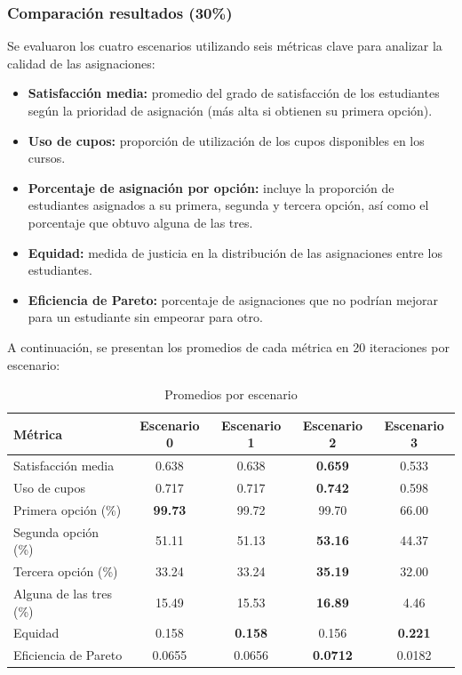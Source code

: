 \documentclass{article}
\begin{document}
\subsubsection{Comparación resultados (30\%)}

Se evaluaron los cuatro escenarios utilizando seis métricas clave para analizar la calidad de las asignaciones:

\begin{itemize}
  \item \textbf{Satisfacción media:} promedio del grado de satisfacción de los estudiantes según la prioridad de asignación (más alta si obtienen su primera opción).
  \item \textbf{Uso de cupos:} proporción de utilización de los cupos disponibles en los cursos.
  \item \textbf{Porcentaje de asignación por opción:} incluye la proporción de estudiantes asignados a su primera, segunda y tercera opción, así como el porcentaje que obtuvo alguna de las tres.
  \item \textbf{Equidad:} medida de justicia en la distribución de las asignaciones entre los estudiantes.
  \item \textbf{Eficiencia de Pareto:} porcentaje de asignaciones que no podrían mejorar para un estudiante sin empeorar para otro.
\end{itemize}

A continuación, se presentan los promedios de cada métrica en 20 iteraciones por escenario:

\begin{table}[H]
\centering
\caption{Promedios por escenario}
\begin{tabular}{lcccc}
\toprule
\textbf{Métrica} & \textbf{Escenario 0} & \textbf{Escenario 1} & \textbf{Escenario 2} & \textbf{Escenario 3} \\
\midrule
Satisfacción media & 0.638 & 0.638 & \textbf{0.659} & 0.533 \\
Uso de cupos & 0.717 & 0.717 & \textbf{0.742} & 0.598 \\
Primera opción (\%) & \textbf{99.73} & 99.72 & 99.70 & 66.00 \\
Segunda opción (\%) & 51.11 & 51.13 & \textbf{53.16} & 44.37 \\
Tercera opción (\%) & 33.24 & 33.24 & \textbf{35.19} & 32.00 \\
Alguna de las tres (\%) & 15.49 & 15.53 & \textbf{16.89} & 4.46 \\
Equidad & 0.158 & \textbf{0.158} & 0.156 & \textbf{0.221} \\
Eficiencia de Pareto & 0.0655 & 0.0656 & \textbf{0.0712} & 0.0182 \\
\bottomrule
\end{tabular}
\end{table}
\end{document}
